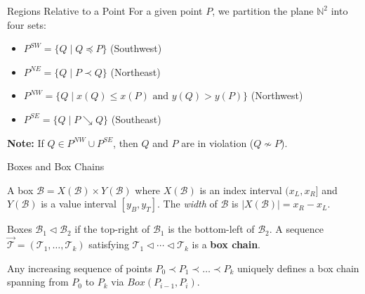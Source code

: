 \documentclass[11pt,aspectratio=169]{beamer}
\newcommand{\bx}{Box}
\begin{document}
\begin{frame}{Regions Relative to a Point}
    For a given point $P$, we partition the plane $\mathbb{N}^2$ into four sets:
    \begin{itemize}
        \item $P^{SW} = \{Q \mid Q \preceq P\}$ (Southwest)
        \item $P^{NE} = \{Q \mid P \prec Q\}$ (Northeast)
        \item $P^{NW} = \{Q \mid x(Q) \leq x(P) \text{ and } y(Q) > y(P)\}$ (Northwest)
        \item $P^{SE} = \{Q \mid P \searrow Q\}$ (Southeast)
    \end{itemize}
    \vspace{0.5cm}
    \textbf{Note:} If $Q \in P^{NW} \cup P^{SE}$, then $Q$ and $P$ are in violation ($Q \not\sim P$).
\end{frame}

\begin{frame}{Boxes and Box Chains}
    \begin{definition}[Box]
        A box $\mathcal{B} = X(\mathcal{B}) \times Y(\mathcal{B})$ where $X(\mathcal{B})$ is an index interval $(x_L, x_R]$ and $Y(\mathcal{B})$ is a value interval $[y_B, y_T]$. The \textit{width} of $\mathcal{B}$ is $|X(\mathcal{B})| = x_R - x_L$.
    \end{definition}

    \begin{definition}
        Boxes $\mathcal{B}_1 \triangleleft \mathcal{B}_2$ if the top-right of $\mathcal{B}_1$ is the bottom-left of $\mathcal{B}_2$. A sequence $\vec{\mathcal{T}} = (\mathcal{T}_1, \dots, \mathcal{T}_k)$ satisfying $\mathcal{T}_1 \triangleleft \cdots \triangleleft \mathcal{T}_k$ is a \textbf{box chain}.
    \end{definition}
    
    Any increasing sequence of points $P_0 \prec P_1 \prec \dots \prec P_k$ uniquely defines a box chain spanning from $P_0$ to $P_k$ via $\bx(P_{i-1}, P_i)$.
\end{frame}
\end{document}

